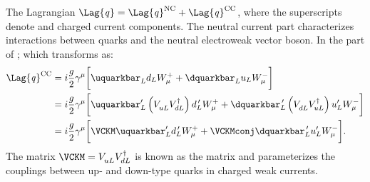 The Lagrangian $\Lag{\it q}=\Lag{\it q}^\mathrm{NC}+\Lag{\it q}^\mathrm{CC}$, where the
superscripts denote \NC and charged current \CC components.
The neutral current part characterizes interactions between quarks and the neutral electroweak
vector boson.
In the \CC part of ; which transforms as:
\begin{align}
  \Lag{\it q}^\mathrm{CC}
  &= i\frac{g}{2}\gamma^\mu
  \bigg[\uquarkbar_Ld_LW^+_\mu + \dquarkbar_Lu_LW^-_\mu
  \bigg]  \nonumber\\
  &= i\frac{g}{2}\gamma^\mu
  \bigg[
    \uquarkbar_L^\prime\left(V_{uL}^{\phantom{\dagger}}V_{dL}^\dagger\right)d_L^{\,\prime} W^+_\mu +
    \dquarkbar_L^{\,\prime}\left(V_{dL}^{\phantom{\dagger}}V_{uL}^\dagger\right)u_L^\prime W^-_\mu
  \bigg]  \nonumber\\
  &= i\frac{g}{2}\gamma^\mu
  \bigg[
    \VCKM\uquarkbar_L^\prime d_L^{\,\prime} W^+_\mu +
    \VCKMconj\dquarkbar_L^{\,\prime} u_L^\prime W^-_\mu
  \bigg].
\end{align}
The matrix $\VCKM=V^{\phantom{\dagger}}_{uL}V_{dL}^\dagger$ is known as the \ckm
matrix and parameterizes the couplings between up- and down-type quarks in charged weak currents.



